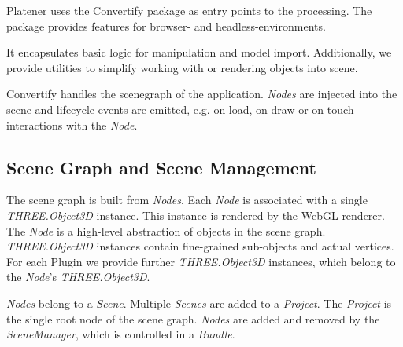 \documentclass[../ClassicThesis.tex]{subfiles}
\begin{document}
Platener uses the Convertify package as entry points to the {\threedmodel}
processing. The package provides features for browser- and
headless-environments.

It encapsulates basic logic for {\threedmodel} manipulation and model import.
Additionally, we provide utilities to simplify working with \emph{\threejs} or
rendering objects into scene.

Convertify handles the scenegraph of the application. \emph{Nodes} are injected
into the scene  and lifecycle events are emitted, e.g. on
load, on draw or on touch interactions with the \emph{Node}.


\subsection{Scene Graph and Scene Management}

The scene graph is built from \emph{Nodes}. Each \emph{Node} is associated
with a single \emph{THREE.Object3D} instance. This instance is rendered by the
WebGL renderer. The \emph{Node} is a high-level abstraction of objects in the
scene graph. \emph{THREE.Object3D} instances contain fine-grained sub-objects and
actual vertices. For each Plugin we provide further \emph{THREE.Object3D}
instances, which belong to the \emph{Node}'s \emph{THREE.Object3D}.

\emph{Nodes} belong to a \emph{Scene}. Multiple \emph{Scenes}
are added to a \emph{Project}. The \emph{Project} is the single root node of the
scene graph. \emph{Nodes} are added and removed by the \emph{SceneManager},
which is controlled in a \emph{Bundle}.

\end{document}

